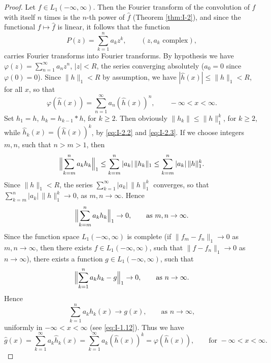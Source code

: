 \begin{proof}
Let $f\in L_1(-\infty,\infty)$. Then the Fourier transform of the convolution of $f$ with itself $n$ times is the $n$-th power of $\widehat f$ (Theorem \ref{thm:I-2}), and since the functional $f\mapsto\widehat f$ is linear, it follows that the function
\begin{equation*}
P(z)=\sum_{k=1}^{n}a_kz^k,\qquad(z,a_k\text{ complex}),
\end{equation*}
carries Fourier transforms into Fourier transforms. By hypothesis we have $\varphi(z)=\sum_{n=1}^{\infty}a_nz^n$, $|z|<R$, the series converging absolutely ($a_0=0$ since $\varphi(0)=0$). Since $\|h\|_1<R$ by assumption, we have $|\widehat h(x)|\le\|h\|_1<R$, for all $x$, so that
\begin{equation*}
\varphi(\widehat h(x))=\sum_{n=1}^{\infty}a_n(\widehat h(x))^n,\qquad-\infty<x<\infty.
\end{equation*}
Set $h_1=h$, $h_k=h_{k-1}*h$, for $k\ge 2$. Then obviously $\|h_k\|\le\|h\|_1^k$, for $k\ge 2$, while $\widehat h_k(x)=(\widehat h(x))^k$, by \eqref{eq:I-2.2} and \eqref{eq:I-2.3}. If we choose integers $m,n$, such that $n>m>1$, then
\begin{equation*}
\Bigl\|\sum_{k=m}^{n}a_kh_k\Bigr\|_1
\le\sum_{k=m}^{n}|a_k|\,\|h_k\|_1
\le\sum_{k=m}^{n}|a_k|\,\|h\|_1^k.
\end{equation*}
Since $\|h\|_1<R$, the series $\sum_{k=1}^{\infty}|a_k|\,\|h\|_1^k$ converges, so that $\sum_{k=m}^{n}|a_k|\,\|h\|_1^k\to 0$, as $m,n\to\infty$. Hence
\begin{equation*}
\Bigl\|\sum_{k=m}^{n}a_kh_k\Bigr\|_1\to 0,\qquad\text{as }m,n\to\infty.
\end{equation*}
Since the function space $L_1(-\infty,\infty)$ is complete (if $\|f_m-f_n\|_1\to 0$ as $m,n\to\infty$, then there exists $f\in L_1(-\infty,\infty)$, such that $\|f-f_n\|_1\to 0$ as $n\to\infty$), there exists a function $g\in L_1(-\infty,\infty)$, such that
\begin{equation*}
\Bigl\|\sum_{k=1}^{n}a_kh_k-g\Bigr\|_1\to 0,\qquad\text{as }n\to\infty.
\end{equation*}
Hence
\begin{equation*}
\sum_{k=1}^{n}a_kh_k(x)\to g(x),\qquad\text{as }n\to\infty,
\end{equation*}
uniformly in $-\infty<x<\infty$ (see \eqref{eq:I-1.12}). Thus we have
\begin{equation*}
\widehat g(x)=\sum_{k=1}^{\infty}a_k\widehat h_k(x)
=\sum_{k=1}^{\infty}a_k(\widehat h(x))^k
=\varphi(\widehat h(x)),\qquad\text{for }-\infty<x<\infty.
\end{equation*}
\end{proof}

